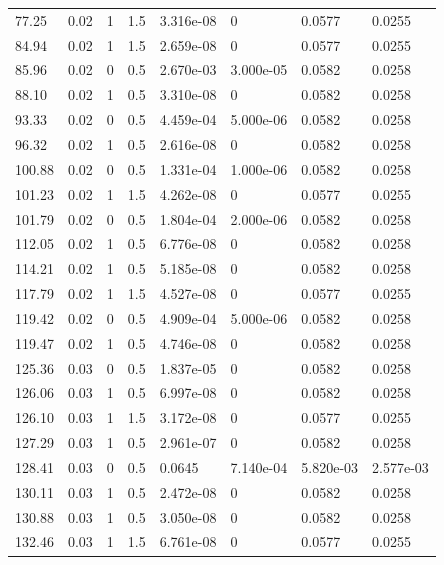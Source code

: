 \documentclass[preview]{standalone}
\begin{document}
{{\begin{tabular}{L{1.2cm}C{1.2cm} C{0.3cm}C{0.5cm} C{1.4cm}C{1.4cm} C{1.4cm}C{1.4cm}}
  77.25  &  0.02  & 1     & 1.5 &  3.316e-08  & 0  & 0.0577 &  0.0255   \\ 
  84.94  &  0.02  & 1     & 1.5 &  2.659e-08  & 0  & 0.0577 &  0.0255   \\ 
  85.96  &  0.02  & 0     & 0.5 &  2.670e-03  & 3.000e-05  & 0.0582 &  0.0258   \\ 
  88.10  &  0.02  & 1     & 0.5 &  3.310e-08  & 0  & 0.0582 &  0.0258   \\ 
  93.33  &  0.02  & 0     & 0.5 &  4.459e-04  & 5.000e-06  & 0.0582 &  0.0258   \\ 
  96.32  &  0.02  & 1     & 0.5 &  2.616e-08  & 0  & 0.0582 &  0.0258   \\ 
  100.88  &  0.02  & 0     & 0.5 &  1.331e-04  & 1.000e-06  & 0.0582 &  0.0258   \\ 
  101.23  &  0.02  & 1     & 1.5 &  4.262e-08  & 0  & 0.0577 &  0.0255   \\ 
  101.79  &  0.02  & 0     & 0.5 &  1.804e-04  & 2.000e-06  & 0.0582 &  0.0258   \\ 
  112.05  &  0.02  & 1     & 0.5 &  6.776e-08  & 0  & 0.0582 &  0.0258   \\ 
  114.21  &  0.02  & 1     & 0.5 &  5.185e-08  & 0  & 0.0582 &  0.0258   \\ 
  117.79  &  0.02  & 1     & 1.5 &  4.527e-08  & 0  & 0.0577 &  0.0255   \\ 
  119.42  &  0.02  & 0     & 0.5 &  4.909e-04  & 5.000e-06  & 0.0582 &  0.0258   \\ 
  119.47  &  0.02  & 1     & 0.5 &  4.746e-08  & 0  & 0.0582 &  0.0258   \\ 
  125.36  &  0.03  & 0     & 0.5 &  1.837e-05  & 0  & 0.0582 &  0.0258   \\ 
  126.06  &  0.03  & 1     & 0.5 &  6.997e-08  & 0  & 0.0582 &  0.0258   \\ 
  126.10  &  0.03  & 1     & 1.5 &  3.172e-08  & 0  & 0.0577 &  0.0255   \\ 
  127.29  &  0.03  & 1     & 0.5 &  2.961e-07  & 0  & 0.0582 &  0.0258   \\ 
  128.41  &  0.03  & 0     & 0.5 &  0.0645  & 7.140e-04  & 5.820e-03 &  2.577e-03   \\ 
  130.11  &  0.03  & 1     & 0.5 &  2.472e-08  & 0  & 0.0582 &  0.0258   \\ 
  130.88  &  0.03  & 1     & 0.5 &  3.050e-08  & 0  & 0.0582 &  0.0258   \\ 
  132.46  &  0.03  & 1     & 1.5 &  6.761e-08  & 0  & 0.0577 &  0.0255   \\ 

\end{tabular}}}
\end{document}
